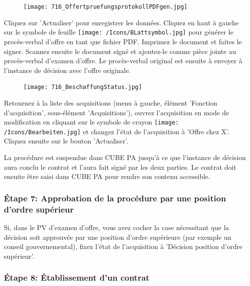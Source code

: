 \vspace{\baselineskip}

\begin{figure}
\vspace{-15pt}
\texttt{[image: 716\_OffertpruefungsprotokollPDFgen.jpg]}
\end{figure}
Cliquez sur 'Actualiser'  pour enregistrer les données. Cliquez en haut à gauche sur 
le symbole de feuille \texttt{[image: /Icons/BLattsymbol.jpg]} pour générer le procès-verbal d'offre en tant que fichier PDF. Imprimez le document et faites le signer. Scannez ensuite le document signé et ajoutez-le comme pièce jointe au procès-verbal 
d'examen d'offre. Le procès-verbal original est ensuite à envoyer à l'instance de décision avec l'offre originale.

\vspace{\baselineskip}

\begin{figure}
\vspace{-15pt}
\texttt{[image: 716\_BeschaffungStatus.jpg]}
\end{figure}
Retournez à la liste des acquisitions (menu à gauche, élément 'Fonction d'acquisition', sous-élément 'Acquisitions'), ouvrez l'acquisition en mode de modification en cliquant sur le symbole de crayon \texttt{[image: /Icons/Bearbeiten.jpg]} et changez l'état de l'acquisition à 'Offre chez X'. Cliquez ensuite sur le bouton 'Actualiser'.

\vspace{\baselineskip}

La procédure est suspendue dans CUBE PA jusqu'à ce que l'instance de décision aura conclu le contrat et l'aura fait signé par les deux parties. Le contrat doit ensuite être saisi dans CUBE PA pour rendre son contenu accessible.

\subsubsection{Étape 7: Approbation de la procédure par une position d'ordre supérieur}

Si, dans le PV d'examen d'offre, vous avez cocher la case nécessitant que la décision soit approuvée par une position d'ordre supérieure (par exemple un conseil gouvernemental), fixez l'état de l'acquisition à 'Décision position d'ordre supérieur'.

\subsubsection{Étape 8: Établissement d'un contrat}

